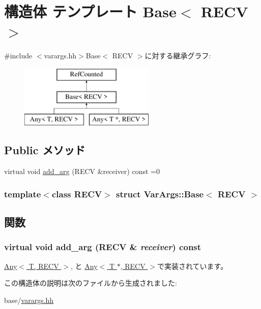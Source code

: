 \hypertarget{structVarArgs_1_1Base}{
\section{構造体 テンプレート Base$<$ RECV $>$}
\label{structVarArgs_1_1Base}
}


{\ttfamily \#include $<$varargs.hh$>$}Base$<$ RECV $>$に対する継承グラフ:\begin{figure}[H]
\begin{center}
\leavevmode
\includegraphics[height=3cm]{structVarArgs_1_1Base}
\end{center}
\end{figure}
\subsection*{Public メソッド}
\begin{DoxyCompactItemize}
\item 
virtual void \hyperlink{structVarArgs_1_1Base_ab6d5cea89e524f1ebe6ae84147552b0c}{add\_\-arg} (RECV \&receiver) const =0
\end{DoxyCompactItemize}
\subsubsection*{template$<$class RECV$>$ struct VarArgs::Base$<$ RECV $>$}



\subsection{関数}
\hypertarget{structVarArgs_1_1Base_ab6d5cea89e524f1ebe6ae84147552b0c}{
\subsubsection[{add\_\-arg}]{\setlength{\rightskip}{0pt plus 5cm}virtual void add\_\-arg (RECV \& {\em receiver}) const}}
\label{structVarArgs_1_1Base_ab6d5cea89e524f1ebe6ae84147552b0c}


\hyperlink{structVarArgs_1_1Any_ab9c3a36cee779f61ec3d8d4d3db17f87}{Any$<$ T, RECV $>$}, と \hyperlink{structVarArgs_1_1Any_3_01T_01_5_00_01RECV_01_4_ab9c3a36cee779f61ec3d8d4d3db17f87}{Any$<$ T $\ast$, RECV $>$}で実装されています。

この構造体の説明は次のファイルから生成されました:\begin{DoxyCompactItemize}
\item 
base/\hyperlink{varargs_8hh}{varargs.hh}\end{DoxyCompactItemize}
